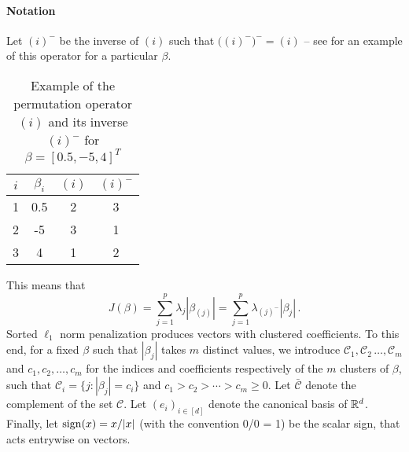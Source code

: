 \paragraph{Notation}\label{sec:notation}

Let \((i)^{-}\) be the inverse of \((i)\) such that
\(\big((i)^-\big)^- = (i)\) -- see  for an
example of this operator for a particular \(\beta\).
\begin{table}
  \centering
  \caption{Example of the permutation operator \((i)\) and its inverse
    \((i)^-\) for $\beta = [0.5, -5, 4]^T$}
    \label{tab:permutation-example}
  \begin{tabular}{cccc}
    \toprule
    \(i\) & \(\beta_i\) & \((i)\) & \((i)^-\) \\
    \midrule
    1     & 0.5         & 2       & 3         \\
    2     & -5          & 3       & 1         \\
    3     & 4           & 1       & 2         \\
    \bottomrule
  \end{tabular}
\end{table}
This means that
\[
  J(\beta) = \sum_{j=1}^p \lambda_j |\beta_{(j)}|
  = \sum_{j=1}^p \lambda_{(j)^-}|\beta_j| \,.
\]
Sorted $\ell_1$ norm penalization produces vectors with clustered coefficients.
To this end, for a fixed $\beta$ such that $|\beta_j|$ takes $m$ distinct values, we introduce \(\mathcal{C}_1, \mathcal{C}_2\, \dots, \mathcal{C}_m\) and \(c_1,
c_2, \dots, c_m\) for the indices and coefficients respectively of the \(m\)
clusters of $\beta$, such that
$\mathcal{C}_i = \{j : |\beta_j| = c_i\}$ and $c_1 > c_2 > \cdots > c_m \geq 0.$
Let \(\bar{\mathcal{C}}\) denote the complement of the set \(\mathcal{C}\).
Let $(e_i)_{i \in [d]}$ denote the canonical basis of $\mathbb{R}^d$.
Finally, let $\operatorname{sign}(x) = x / |x|$ (with the convention 0/0 = 1) be the scalar sign, that acts entrywise on vectors.


